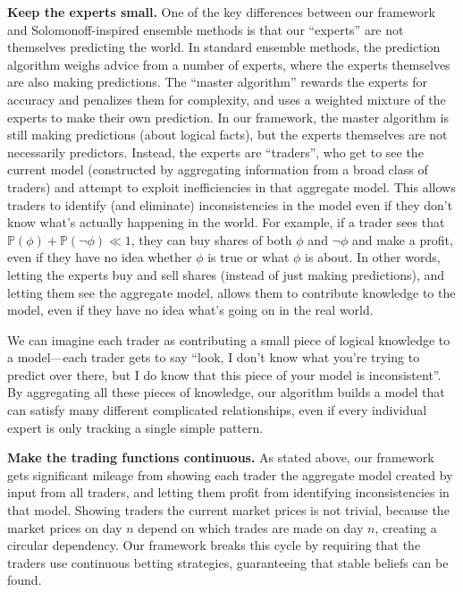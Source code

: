 \documentclass[authordate,onecolumn,noenvironments]{miri-tech-article}
\numberwithin{equation}{subsection}
\newcommand{\nn}{n}
\newcommand{\tinysection}[1]{\medskip\noindent\textbf{#1.}}
\newcommand{\BelState}{\mathbb{P}}
\newcommand{\pt}{\BelState}
\begin{document}
\tinysection{Keep the experts small} One of the key differences between our framework and Solomonoff-inspired ensemble methods is that our ``experts'' are not themselves predicting the world. In standard ensemble methods, the prediction algorithm weighs advice from a number of experts, where the experts themselves are also making predictions. The ``master algorithm'' rewards the experts for accuracy and penalizes them for complexity, and uses a weighted mixture of the experts to make their own prediction. In our framework, the master algorithm is still making predictions (about logical facts), but the experts themselves are not necessarily predictors. Instead, the experts are ``traders'', who get to see the current model (constructed by aggregating information from a broad class of traders) and attempt to exploit inefficiencies in that aggregate model. This allows traders to identify (and eliminate) inconsistencies in the model even if they don't know what's actually happening in the world. For example, if a trader sees that $\pt(\phi) + \pt(\lnot \phi) \ll 1$, they can buy shares of both $\phi$ and $\lnot \phi$ and make a profit, even if they have no idea whether $\phi$ is true or what $\phi$ is about. In other words, letting the experts buy and sell shares (instead of just making predictions), and letting them see the aggregate model, allows them to contribute knowledge to the model, even if they have no idea what's going on in the real world.

We can imagine each trader as contributing a small piece of logical knowledge to a model---each trader gets to say ``look, I don't know what you're trying to predict over there, but I do know that this piece of your model is inconsistent''. By aggregating all these pieces of knowledge, our algorithm builds a model that can satisfy many different complicated relationships, even if every individual expert is only tracking a single simple pattern.

\tinysection{Make the trading functions continuous} As stated above, our framework gets significant mileage from showing each trader the aggregate model created by input from all traders, and letting them profit from identifying inconsistencies in that model. Showing traders the current market prices is not trivial, because the market prices on day $\nn$ depend on which trades are made on day $\nn$, creating a circular dependency. Our framework breaks this cycle by requiring that the traders use continuous betting strategies, guaranteeing that stable beliefs can be found.
\end{document}
